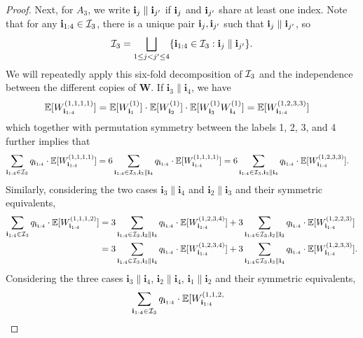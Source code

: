 \documentclass[10pt,reqno]{amsart}
\def\bW{{\mathbf{W}}}
\def\bi{\mathbf{i}}
\begin{document}
\begin{proof}
Next, for $A_3$, we write $\mathbf{i}_j \parallel \mathbf{i}_{j'}$ if $\mathbf{i}_j$ and
$\mathbf{i}_{j'}$ share at
least one index. Note that for any $\mathbf{i}_{1:4} \in \mathcal{I}_3$, there is a unique pair
$\mathbf{i}_j, \mathbf{i}_{j'}$ such that $\mathbf{i}_j \parallel \mathbf{i}_{j'}$, so
\begin{align*}
    \mathcal{I}_3 = \bigsqcup_{1 \leq j<j' \leq 4} \{\mathbf{i}_{1:4} \in \mathcal{I}_3:
    \mathbf{i}_j \parallel \mathbf{i}_{j'}\}.
\end{align*}
We will repeatedly apply this six-fold decomposition of $\mathcal{I}_3$ and the
independence between the different copies of $\bW$.
If $\bi_3 \parallel \bi_4$, we have
\begin{align*}
    \mathbb{E}[W_{\mathbf{i}_{1:4}}^{(1, 1, 1, 1)}] &= \mathbb{E}[W_{\mathbf{i}_1}^{(1)}] \cdot 
    \mathbb{E}[W_{\mathbf{i}_2}^{(1)}] \cdot \mathbb{E}[W_{\mathbf{i}_3}^{(1)} W_{\mathbf{i}_4}^{(1)}]
    = \mathbb{E}[W_{\mathbf{i}_{1:4}}^{(1, 2, 3, 3)}]
\end{align*}
which together with permutation symmetry between the labels 1, 2, 3, and 4
further implies that 
\begin{align}\label{eq:sym_moment_decomp_2_1}
    \sum_{\mathbf{i}_{1:4} \in \mathcal{I}_3} q_{\mathbf{i}_{1:4}} \cdot \mathbb{E}[W_{\mathbf{i}_{1:4}}^{(1, 1, 1, 1)}]
    &= 6 \sum_{\mathbf{i}_{1:4} \in \mathcal{I}_3, \mathbf{i}_3 \parallel \mathbf{i}_4} 
    q_{\mathbf{i}_{1:4}} \cdot \mathbb{E}[W_{\mathbf{i}_{1:4}}^{(1, 1, 1, 1)}]
    = 6 \sum_{\mathbf{i}_{1:4} \in \mathcal{I}_3, \mathbf{i}_3 \parallel \mathbf{i}_4} q_{\mathbf{i}_{1:4}} 
    \cdot \mathbb{E}[W_{\mathbf{i}_{1:4}}^{(1, 2, 3, 3)}].
\end{align}
Similarly, considering the two cases $\bi_3 \parallel \bi_4$
and $\bi_2 \parallel \bi_3$ and their symmetric equivalents,
\begin{align}\label{eq:sym_moment_decomp_2_2}
    \sum_{\mathbf{i}_{1:4} \in \mathcal{I}_3} q_{\mathbf{i}_{1:4}} \cdot \mathbb{E}[W_{\mathbf{i}_{1:4}}^{(1, 1, 1, 2)}]
    &= 3 \sum_{\mathbf{i}_{1:4} \in \mathcal{I}_3, \mathbf{i}_3 \parallel \mathbf{i}_4}
    q_{\mathbf{i}_{1:4}} \cdot \mathbb{E}[W_{\mathbf{i}_{1:4}}^{(1, 2, 3, 4)}]
    + 3 \sum_{\mathbf{i}_{1:4} \in \mathcal{I}_3, \mathbf{i}_2 \parallel \mathbf{i}_3} q_{\mathbf{i}_{1:4}} 
    \cdot \mathbb{E}[W_{\mathbf{i}_{1:4}}^{(1, 2, 2, 3)}]\notag \\
    &= 3 \sum_{\mathbf{i}_{1:4} \in \mathcal{I}_3, \mathbf{i}_3 \parallel \mathbf{i}_4}
    q_{\mathbf{i}_{1:4}} \cdot \mathbb{E}[W_{\mathbf{i}_{1:4}}^{(1, 2, 3, 4)}]
    + 3 \sum_{\mathbf{i}_{1:4} \in \mathcal{I}_3, \mathbf{i}_3 \parallel \mathbf{i}_4} q_{\mathbf{i}_{1:4}} 
    \cdot \mathbb{E}[W_{\mathbf{i}_{1:4}}^{(1, 2, 3, 3)}].
\end{align}
Considering the three cases $\bi_3 \parallel \bi_4$, $\bi_2 \parallel \bi_4$,
$\bi_1 \parallel \bi_2$ and their symmetric equivalents,
\begin{align}\label{eq:sym_moment_decomp_2_3}
    &\sum_{\mathbf{i}_{1:4} \in \mathcal{I}_3} q_{\mathbf{i}_{1:4}} \cdot \mathbb{E}[W_{\mathbf{i}_{1:4}}^{(1, 1, 2,
}
\end{align}
\end{proof}
\end{document}
